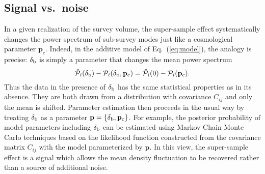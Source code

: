 \documentclass[prd,twocolumn,amsmath,amssymb,floatfix,superscriptaddress]{revtex4-1}
\newcommand{\br}{{\rm b}}
\newcommand{\Dv}{{\cal P}}
\begin{document}
{\subsection{Signal vs.\ noise}
\label{sub:est1}

In a given realization of the survey volume, the super-sample effect systematically
changes the power spectrum of sub-survey modes just like a cosmological parameter 
$\mathbf{p}_\textrm{c}$.
Indeed, in the additive model of Eq.~(\ref{eq:model}), the analogy is precise: 
$\delta_\br$ is simply a parameter
that changes the mean power spectrum
\begin{equation}
 \hat \Dv_i(\delta_\br) -
 \Dv_i(\delta_\br ,\mathbf{p}_\textrm{c}) 
 =  \hat \Dv_i(0)  - \Dv_i(\mathbf{p}_\textrm{c}) .
\end{equation}
Thus the data in the presence of $\delta_{\br}$ has the same statistical properties 
as in its absence.  They are both drawn from a distribution with covariance $C_{ij}$ and only
the mean is shifted.
Parameter estimation then proceeds in the usual way by treating $\delta_{\br}$ as
a parameter $\mathbf{p}=\{\delta_\br,\mathbf{p}_\textrm{c}\}$.
For example, the posterior
probability of model parameters including $\delta_\br$  can be estimated using
 Markov Chain Monte Carlo techniques based on the likelihood function constructed from the covariance matrix $C_{ij}$ with the model parameterized
by $\mathbf{p}$.
In this view, the super-sample effect is a signal which allows the mean density fluctuation
to be recovered rather than a source of additional noise.

}
\end{document}
